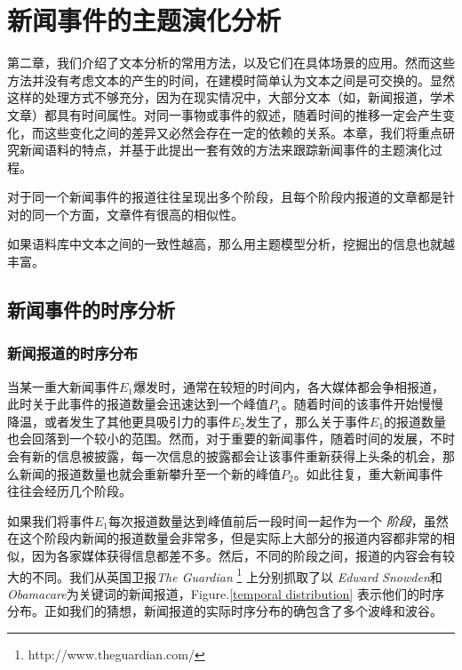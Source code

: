\chapter{新闻事件的主题演化分析}
第二章，我们介绍了文本分析的常用方法，以及它们在具体场景的应用。然而这些方法并没有考虑文本的产生的时间，在建模时简单认为文本之间是可交换的。显然这样的处理方式不够充分，因为在现实情况中，大部分文本（如，新闻报道，学术文章）都具有时间属性。对同一事物或事件的叙述，随着时间的推移一定会产生变化，而这些变化之间的差异又必然会存在一定的依赖的关系。本章，我们将重点研究新闻语料的特点，并基于此提出一套有效的方法来跟踪新闻事件的主题演化过程。

\begin{hyp}
\label{hyp:newsdistribution}
对于同一个新闻事件的报道往往呈现出多个阶段，且每个阶段内报道的文章都是针对的同一个方面，文章件有很高的相似性。
\end{hyp}

\begin{hyp}
\label{hyp:coherence}
如果语料库中文本之间的一致性越高，那么用主题模型分析，挖掘出的信息也就越丰富。
\end{hyp}

\section{新闻事件的时序分析}
\subsection{新闻报道的时序分布}
当某一重大新闻事件$E_1$爆发时，通常在较短的时间内，各大媒体都会争相报道，此时关于此事件的报道数量会迅速达到一个峰值$P_1$。随着时间的该事件开始慢慢降温，或者发生了其他更具吸引力的事件$E_2$发生了，那么关于事件$E_1$的报道数量也会回落到一个较小的范围。然而，对于重要的新闻事件，随着时间的发展，不时会有新的信息被披露，每一次信息的披露都会让该事件重新获得上头条的机会，那么新闻的报道数量也就会重新攀升至一个新的峰值$P_2$。如此往复，重大新闻事件往往会经历几个阶段。

如果我们将事件$E_1$每次报道数量达到峰值前后一段时间一起作为一个 \emph{阶段}，虽然在这个阶段内新闻的报道数量会非常多，但是实际上大部分的报道内容都非常的相似，因为各家媒体获得信息都差不多。然后，不同的阶段之间，报道的内容会有较大的不同。我们从英国卫报\emph{The Guardian} \footnote{http://www.theguardian.com/} 上分别抓取了以 \emph{Edward Snowden}和\emph{Obamacare}为关键词的新闻报道，Figure.\ref{temporal distribution} 表示他们的时序分布。正如我们的猜想，新闻报道的实际时序分布的确包含了多个波峰和波谷。

